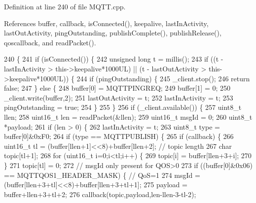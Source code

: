 Definition at line 240 of file M\+Q\+T\+T.\+cpp.



References buffer, callback, is\+Connected(), keepalive, last\+In\+Activity, last\+Out\+Activity, ping\+Outstanding, publish\+Complete(), publish\+Release(), qoscallback, and read\+Packet().


\begin{DoxyCode}
240                 \{
241     \textcolor{keywordflow}{if} (isConnected()) \{
242         \textcolor{keywordtype}{unsigned} \textcolor{keywordtype}{long} t = millis();
243         \textcolor{keywordflow}{if} ((t - lastInActivity > this->keepalive*1000UL) || (t - 
      lastOutActivity > this->keepalive*1000UL)) \{
244             \textcolor{keywordflow}{if} (pingOutstanding) \{
245                 _client.stop();
246                 \textcolor{keywordflow}{return} \textcolor{keyword}{false};
247             \} \textcolor{keywordflow}{else} \{
248                 buffer[0] = MQTTPINGREQ;
249                 buffer[1] = 0;
250                 _client.write(buffer,2);
251                 lastOutActivity = t;
252                 lastInActivity = t;
253                 pingOutstanding = \textcolor{keyword}{true};
254             \}
255         \}
256         \textcolor{keywordflow}{if} (_client.available()) \{
257             uint8\_t llen;
258             uint16\_t len = readPacket(&llen);
259             uint16\_t msgId = 0;
260             uint8\_t *payload;
261             \textcolor{keywordflow}{if} (len > 0) \{
262                 lastInActivity = t;
263                 uint8\_t type = buffer[0]&0xF0;
264                 \textcolor{keywordflow}{if} (type == MQTTPUBLISH) \{
265                     \textcolor{keywordflow}{if} (callback) \{
266                         uint16\_t tl = (buffer[llen+1]<<8)+buffer[llen+2]; \textcolor{comment}{// topic length}
267                         \textcolor{keywordtype}{char} topic[tl+1];
268                         \textcolor{keywordflow}{for} (uint16\_t i=0;i<tl;i++) \{
269                             topic[i] = buffer[llen+3+i];
270                         \}
271                         topic[tl] = 0;
272                         \textcolor{comment}{// msgId only present for QOS>0}
273                         \textcolor{keywordflow}{if} ((buffer[0]&0x06) == MQTTQOS1_HEADER_MASK) \{ \textcolor{comment}{// QoS=1}
274                             msgId = (buffer[llen+3+tl]<<8)+buffer[llen+3+tl+1];
275                             payload = buffer+llen+3+tl+2;
276                             callback(topic,payload,len-llen-3-tl-2);

\end{DoxyCode}
